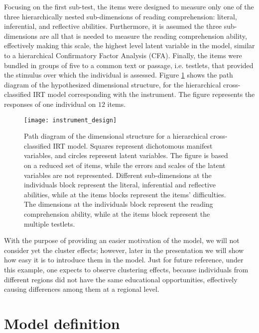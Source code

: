 Focusing on the first sub-test, the items were designed to measure only one of the three hierarchically nested sub-dimensions of reading comprehension: literal, inferential, and reflective abilities. Furthermore, it is assumed the three sub-dimensions are all that is needed to measure the reading comprehension ability, effectively making this scale, the highest level latent variable in the model, similar to a hierarchical Confirmatory Factor Analysis (CFA). Finally, the items were bundled in groups of five to a common text or passage, i.e. testlets, that provided the stimulus over which the individual is assessed. Figure \ref{fig:design} shows the path diagram of the hypothesized dimensional structure, for the hierarchical cross-classified IRT model corresponding with the instrument. The figure represents the responses of one individual on $12$ items.
%
\begin{figure}[h]
	\centering
	\texttt{[image: instrument\_design]}
	\caption[Path diagram of the dimensional structure for a hierarchical cross-classified IRT model.]%
	{Path diagram of the dimensional structure for a hierarchical cross-classified IRT model. Squares represent dichotomous manifest variables, and circles represent latent variables. The figure is based on a reduced set of items, while the errors and scales of the latent variables are not represented. Different sub-dimensions at the individuals block represent the literal, inferential and reflective abilities, while at the items blocks represent the items' difficulties. The dimensions at the individuals block represent the reading comprehension ability, while at the items block represent the multiple testlets.}
	\label{fig:design}
\end{figure}

With the purpose of providing an easier motivation of the model, we will not consider yet the cluster effects; however, later in the presentation we will show how easy it is to introduce them in the model. Just for future reference, under this example, one expects to observe clustering effects, because individuals from different regions did not have the same educational opportunities, effectively causing differences among them at a regional level.


\section{Model definition} \label{sect:definition}

